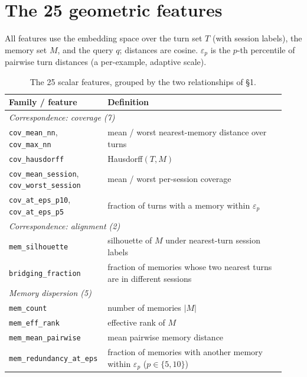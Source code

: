 \documentclass{article}
\begin{document}



\newpage
\appendix
\section{The 25 geometric features}
\label{app:features}

All features use the embedding space over the turn set $T$ (with session labels),
the memory set $M$, and the query $q$; distances are cosine. $\varepsilon_p$ is the
$p$-th percentile of pairwise turn distances (a per-example, adaptive scale).

\begin{table}[h]
  \centering\small
  \caption{The 25 scalar features, grouped by the two relationships of \S1.}
  \label{tab:features}
  \begin{tabular}{p{0.30\linewidth}p{0.63\linewidth}}
    \toprule
    Family / feature & Definition \\
    \midrule
    \multicolumn{2}{l}{\emph{Correspondence: coverage (7)}}\\
    \texttt{cov\_mean\_nn}, \texttt{cov\_max\_nn} & mean / worst nearest-memory distance over turns \\
    \texttt{cov\_hausdorff} & Hausdorff$(T,M)$ \\
    \texttt{cov\_mean\_session}, \texttt{cov\_worst\_session} & mean / worst per-session coverage \\
    \texttt{cov\_at\_eps\_p10}, \texttt{cov\_at\_eps\_p5} & fraction of turns with a memory within $\varepsilon_p$ \\
    \midrule
    \multicolumn{2}{l}{\emph{Correspondence: alignment (2)}}\\
    \texttt{mem\_silhouette} & silhouette of $M$ under nearest-turn session labels \\
    \texttt{bridging\_fraction} & fraction of memories whose two nearest turns are in different sessions \\
    \midrule
    \multicolumn{2}{l}{\emph{Memory dispersion (5)}}\\
    \texttt{mem\_count} & number of memories $|M|$ \\
    \texttt{mem\_eff\_rank} & effective rank of $M$ \\
    \texttt{mem\_mean\_pairwise} & mean pairwise memory distance \\
    \texttt{mem\_redundancy\_at\_eps} & fraction of memories with another memory within $\varepsilon_p$ ($p{\in}\{5,10\}$) \\

\end{tabular}
\end{table}
\end{document}
